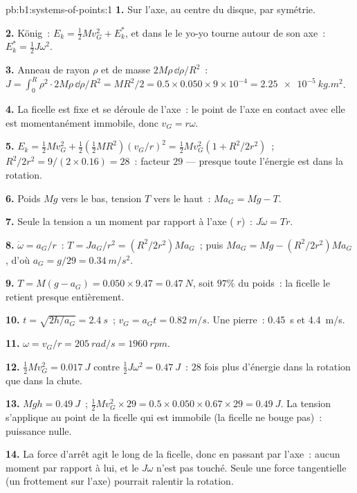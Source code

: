 \begin{solution}{pb:b1:systems-of-points:1}
\textbf{1.} Sur l'axe, au centre du disque, par symétrie.

\textbf{2.} König~: $E_k = \tfrac12 Mv_G^2 + E_k^*$, et dans le  le yo-yo tourne autour de son axe~: $E_k^* = \tfrac12 J\omega^2$.

\textbf{3.} Anneau de rayon $\rho$ et de masse $2M\rho\,\dd\rho/R^2$~: $J = \int_0^R
\rho^2\cdot 2M\rho\,\dd\rho/R^2 = MR^2/2 = 0.5 \times 0.050 \times 9\times10^{-4}
= \qty{2.25e-5}{kg.m^2}$.

\textbf{4.} La ficelle est fixe et se déroule de l'axe~: le point de
l'axe en contact avec elle est momentanément immobile, donc $v_G = r\omega$.

\textbf{5.} $E_k = \tfrac12 Mv_G^2 + \tfrac12(\tfrac12 MR^2)(v_G/r)^2 = \tfrac12
Mv_G^2(1 + R^2/2r^2)$~; $R^2/2r^2 = 9/(2 \times 0.16) = 28$~: facteur $29$ ---
presque toute l'énergie est dans la rotation.

\textbf{6.} Poids $Mg$ vers le bas, tension $T$ vers le haut~: $Ma_G = Mg - T$.

\textbf{7.} Seule la tension a un moment par rapport à l'axe ( $r$)~:
$J\dot\omega = Tr$.

\textbf{8.} $\dot\omega = a_G/r$~: $T = Ja_G/r^2 = (R^2/2r^2)Ma_G$~; puis
$Ma_G = Mg - (R^2/2r^2)Ma_G$, d'où $a_G = g/29 = \qty{0.34}{m/s^2}$.

\textbf{9.} $T = M(g - a_G) = 0.050 \times 9.47 = \qty{0.47}{N}$, soit $97\%$
du poids~: la ficelle le retient presque entièrement.

\textbf{10.} $t = \sqrt{2h/a_G} = \qty{2.4}{s}$~; $v_G = a_Gt = \qty{0.82}{m/s}$.
Une pierre~: \qty{0.45}{s} et \qty{4.4}{m/s}.

\textbf{11.} $\omega = v_G/r = \qty{205}{rad/s} = \qty{1960}{rpm}$.

\textbf{12.} $\tfrac12 Mv_G^2 = \qty{0.017}{J}$ contre $\tfrac12 J\omega^2 =
\qty{0.47}{J}$~: $28$ fois plus d'énergie dans la rotation que dans la chute.

\textbf{13.} $Mgh = \qty{0.49}{J}$~; $\tfrac12 Mv_G^2 \times 29 = 0.5 \times 0.050
\times 0.67 \times 29 = \qty{0.49}{J}$. La tension s'applique au point de
la ficelle qui est immobile (la ficelle ne bouge pas)~: puissance nulle.

\textbf{14.} La force d'arrêt agit le long de la ficelle, donc en passant
par l'axe~: aucun moment par rapport à lui, et le 
$J\omega$ n'est pas touché. Seule une force tangentielle (un frottement
sur l'axe) pourrait ralentir la rotation.


\end{solution}
